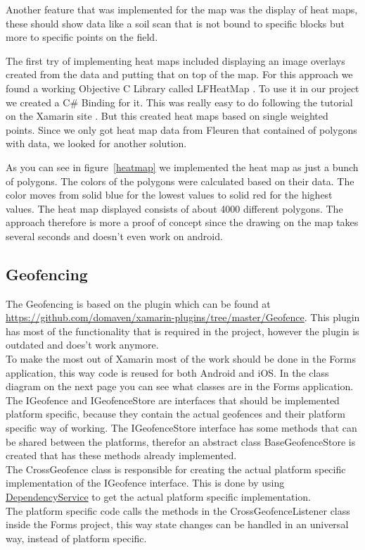 Another feature that was implemented for the map was the display of heat maps, these should show data like a soil scan that is not bound to specific blocks but more to specific points on the field. 

The first try of implementing heat maps included displaying an image \glspl{overlay} created from the data and putting that on top of the map. For this approach we found a working Objective C Library called LFHeatMap \cite{LFHeatMaps}. To use it in our project we created a C\# Binding for it. 
This was really easy to do following the tutorial on the Xamarin site \cite{bindingtut}. But this created heat maps based on single weighted points. Since we only got heat map data from Fleuren that contained of polygons with data, we looked for another solution.

As you can see in figure~\ref{heatmap} we implemented the heat map as just a bunch of polygons. The colors of the polygons were calculated based on their data. The color moves from solid blue for the lowest values to solid red for the highest values. The heat map displayed consists of about 4000 different polygons. The approach therefore is more a proof of concept since the drawing on the map takes several seconds and doesn't even work on android.


\subsection{Geofencing}

The Geofencing is based on the plugin which can be found at \url{https://github.com/domaven/xamarin-plugins/tree/master/Geofence}. This plugin has most of the functionality that is required in the project, however the plugin is outdated and does't work anymore. \\
To make the most out of Xamarin most of the work should be done in the Forms application, this way code is reused for both Android and iOS. In the class diagram on the next page you can see what classes are in the Forms application. \\ The IGeofence and IGeofenceStore are interfaces that should be implemented platform specific, because they contain the actual geofences and their platform specific way of working. The IGeofenceStore interface has some methods that can be shared between the platforms, therefor an abstract class BaseGeofenceStore is created that has these methods already implemented.\\
The CrossGeofence class is responsible for creating the actual platform specific implementation of the IGeofence interface. This is done by using \href{https://developer.xamarin.com/guides/xamarin-forms/dependency-service/}{DependencyService} to get the actual platform specific implementation. \\
The platform specific code calls the methods in the CrossGeofenceListener class inside the Forms project, this way state changes can be handled in an universal way, instead of platform specific.

